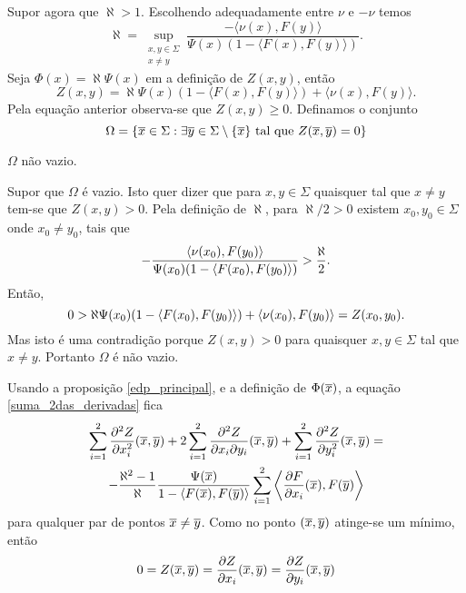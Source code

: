 Supor agora que $\aleph > 1$. Escolhendo adequadamente entre $\nu$ e $-\nu$ temos
\begin{equation*}
	\aleph = \sup_{\substack{x,y \in \Sigma\\ x \neq y}} \frac{- \langle \nu(x), F(y) \rangle}{\Psi(x)(1 - \langle F(x), F(y) \rangle)}.
\end{equation*}
Seja $\Phi(x) = \aleph \Psi(x)$ em a definição de $Z(x,y)$, então
\begin{equation*}
	Z(x,y) = \aleph \Psi(x)(1 - \langle F(x), F(y) \rangle) + \langle \nu(x), F(y) \rangle.
\end{equation*}
Pela equação anterior observa-se que $Z(x,y) \geq 0$.
Definamos o conjunto
\begin{equation*}
	\Omega = \{ \overline{x} \in \Sigma: \exists \overline{y} \in \Sigma \setminus \{\overline{x}\} \text{ tal que } Z(\overline{x},\overline{y}) = 0 \}
\end{equation*}

\begin{proposicao}
	$\Omega$ não vazio.
\end{proposicao}

\begin{demonstracao}
	Supor que $\Omega$ é vazio. 
	Isto quer dizer que para $x,y \in \Sigma$ quaisquer tal que $x \neq y$ tem-se que $Z(x,y)>0$.
	Pela definição de $\aleph$, para $\aleph/2 > 0$ existem $x_0, y_0 \in \Sigma$ onde $x_0 \neq y_0$, tais que
	\begin{equation*}
		-\frac{\left\langle \nu(x_0),F(y_0) \right\rangle}{\Psi(x_0) (1 - \left\langle F(x_0),F(y_0) \right\rangle)} > \frac{\aleph}{2}.
	\end{equation*}
	Então,
	\begin{equation*}
		0 > \aleph \Psi(x_0) (1 - \left\langle F(x_0),F(y_0) \right\rangle) + \left\langle \nu(x_0),F(y_0) \right\rangle = Z(x_0,y_0).
	\end{equation*}
	Mas isto é uma contradição porque $Z(x,y) > 0$ para quaisquer $x,y \in \Sigma$ tal que $x \neq y$.
	Portanto $\Omega$ é não vazio.
\end{demonstracao}

Usando a proposição \eqref{edp_principal}, e a definição de $\Phi(\overline{x})$, a equação \eqref{suma_2das_derivadas} fica
\begin{multline}\label{suma_2da_der_aleph}
\sum_{i=1}^2 \frac{\partial^2 Z}{\partial x_i^2}(\overline{x},\overline{y}) + 2 \sum_{i=1}^2 \frac{\partial^2 Z}{\partial x_i \partial y_i}(\overline{x},\overline{y}) + \sum_{i=1}^2 \frac{\partial^2 Z}{\partial y_i^2}(\overline{x},\overline{y}) =\\
- \frac{\aleph^2 - 1}{\aleph} \frac{\Psi(\overline{x})}{1 - \langle F(\overline{x}), F(\overline{y}) \rangle} \sum_{i=1}^2 \left\langle \frac{\partial F}{\partial x_i}(\overline{x}), F(\overline{y}) \right\rangle
\end{multline}
para qualquer par de pontos $\overline{x} \neq \overline{y}$. Como no ponto $(\overline{x},\overline{y})$ atinge-se um mínimo, então
\begin{equation*}
	0 = Z(\overline{x},\overline{y}) = \frac{\partial Z}{\partial x_i}(\overline{x},\overline{y}) = \frac{\partial Z}{\partial y_i}(\overline{x},\overline{y})
\end{equation*}

